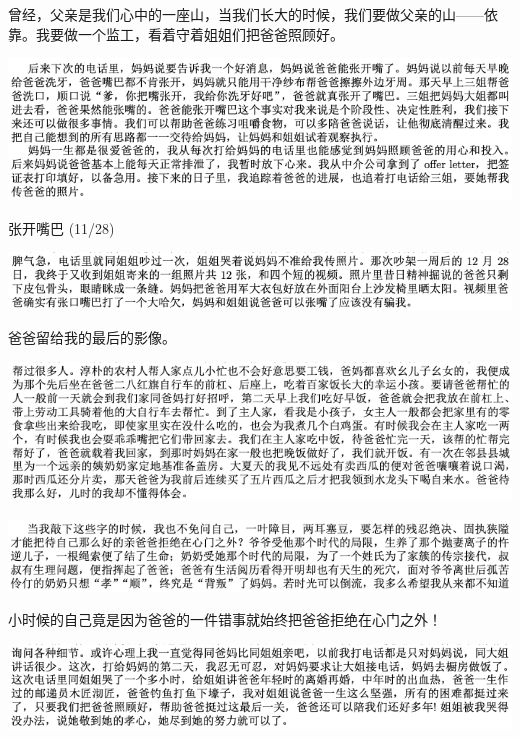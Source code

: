 \documentclass[9pt, b5paper]{article}
\begin{document}
曾经，父亲是我们心中的一座山，当我们长大的时候，我们要做父亲的山——依靠。我要做一个监工，看着守着姐姐们把爸爸照顾好。

\begin{center}
\includegraphics[width=.9\linewidth]{./pic/backups_plans_20210416_163415.png}
\end{center}

张开嘴巴 (11/28)

\begin{center}
\includegraphics[width=.9\linewidth]{./pic/backups_plans_20210416_163715.png}
\end{center}

爸爸留给我的最后的影像。

\begin{center}
\includegraphics[width=.9\linewidth]{./pic/backups_plans_20210417_121853.png}
\end{center}

\begin{center}
\includegraphics[width=.9\linewidth]{./pic/backups_plans_20210417_103433.png}
\end{center}

小时候的自己竟是因为爸爸的一件错事就始终把爸爸拒绝在心门之外！

\begin{center}
\includegraphics[width=.9\linewidth]{./pic/backups_plans_20210416_163811.png}
\end{center}
\end{document}
